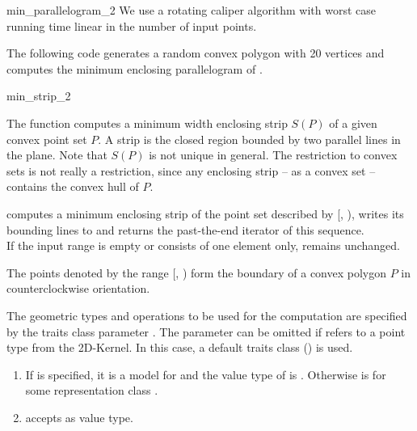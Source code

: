 \begin{ccRefFunction}{min_parallelogram_2}
  \ccImplementation We use a rotating caliper algorithm
  \cite{stvwe-mepa-95,v-fmep-90} with worst case running time linear
  in the number of input points.
  
  \ccExample The following code generates a random convex polygon
   with 20 vertices and computes the minimum enclosing
  parallelogram of .


\end{ccRefFunction}

\begin{ccRefFunction}{min_strip_2}
  
  \ccDefinition The function computes a minimum width enclosing strip
  $S(P)$ of a given convex point set $P$. A strip is the closed region
  bounded by two parallel lines in the plane. Note that $S(P)$ is not
  unique in general.  The restriction to convex sets is not really a
  restriction, since any enclosing strip -- as a convex set --
  contains the convex hull of $P$.


  \def\ccLongParamLayout{\ccTrue} 
  
  
  computes a minimum enclosing strip of the point set described by
  [, ), writes its bounding lines to
   and returns the past-the-end iterator of this sequence.\\
  If the input range is empty or consists of one element only, 
  remains unchanged.
  
  \ccPrecond The points denoted by the range [,
  ) form the boundary of a convex polygon $P$ in
  counterclockwise orientation.

  The geometric types and operations to be used for the computation
  are specified by the traits class parameter . The parameter
  can be omitted if  refers to a point type from
  the 2D-Kernel. In this case, a default traits class
  () is used.
  
  \ccRequire
  \begin{enumerate}
  \item If  is specified, it is a model for
     and the value type  of
     is .  Otherwise
     is  for some representation class
    .
  \item {} accepts  as value type.
  \end{enumerate}
  

\end{ccRefFunction}
